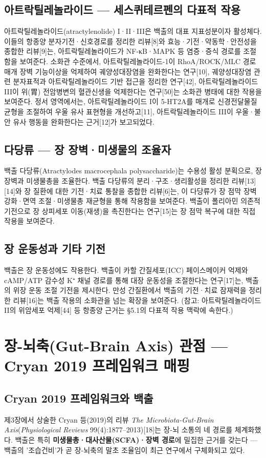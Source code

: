 \documentclass[11pt,oneside]{book}
\begin{document}
\subsection{아트락틸레놀라이드 — 세스퀴테르펜의 다표적 작용}
아트락틸레놀라이드(atractylenolide) I·II·III은 백출의 대표 지표성분이자 활성체다. 이들의 항종양 분자기전·신호경로를 정리한 리뷰[8]와 효능·기전·약동학·안전성을 종합한 리뷰[9]는, 아트락틸레놀라이드가 NF-κB·MAPK 등 염증·증식 경로를 조절함을 보여준다. 소화관 수준에서, 아트락틸레놀라이드-1이 RhoA/ROCK/MLC 경로 매개 장벽 기능이상을 억제하여 궤양성대장염을 완화한다는 연구[10], 궤양성대장염 관련 분자표적과 아트락틸레놀라이드 기반 접근을 정리한 연구[42], 아트락틸레놀라이드 III이 위(胃) 전암병변의 혈관신생을 억제한다는 연구[50]는 소화관 병태에 대한 작용을 보여준다. 정서 영역에서는, 아트락틸레놀라이드 I이 5-HT2A를 매개로 신경전달물질 균형을 조절하여 우울 유사 표현형을 개선하고[11], 아트락틸레놀라이드 III이 우울·불안 유사 행동을 완화한다는 근거[12]가 보고되었다.

\subsection{다당류 — 장 장벽·미생물의 조율자}
백출 다당류(Atractylodes macrocephala polysaccharide)는 수용성 활성 분획으로, 장 장벽과 미생물총을 조율한다. 백출 다당류의 분리·구조·생리활성을 정리한 리뷰[13][14]와 장 질환에 대한 기전·치료 통찰을 종합한 리뷰[6]는, 이 다당류가 장 점막 장벽 강화·면역 조절·미생물총 재균형을 통해 작용함을 보여준다. 백출이 폴리아민 의존적 기전으로 장 상피세포 이동(재생)을 촉진한다는 연구[15]는 장 점막 복구에 대한 직접 작용을 보여준다.

\subsection{장 운동성과 기타 기전}
백출은 장 운동성에도 작용한다. 백출이 카할 간질세포(ICC) 페이스메이커 억제와 cAMP/ATP 감수성 K⁺ 채널 경로를 통해 대장 운동성을 조절한다는 연구[17]는, 백출의 위장 운동 조절 기전을 제시한다. 만성 간질환에서 백출의 기전·치료 잠재력을 정리한 리뷰[16]는 백출 작용의 소화관을 넘는 확장을 보여준다. (참고: 아트락틸레놀라이드 II의 위암세포 억제[44] 등 항종양 근거는 §5.1의 다표적 작용 맥락에 속한다.)

\section{장-뇌축(Gut-Brain Axis) 관점 — Cryan 2019 프레임워크 매핑}
\subsection{Cryan 2019 프레임워크와 백출}
제3장에서 상술한 Cryan 등(2019)의 리뷰 \textit{The Microbiota-Gut-Brain Axis}(\textit{Physiological Reviews} 99(4):1877–2013)[18]는 장-뇌 소통의 네 경로를 체계화했다. 백출은 특히 \textbf{미생물총·대사산물(SCFA)·장벽 경로}에 밀집한 근거를 갖는다 — 백출의 '조습건비'가 곧 장-뇌축의 말초 조율임이 최근 연구에서 구체화되고 있다.
\end{document}
